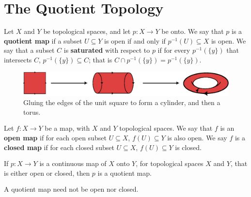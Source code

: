 
\section{The Quotient Topology}

\begin{definition}
    Let $X$ and  $Y$ be topological spaces, and let  $p:X \rightarrow Y$ be onto. We say that  $p$
    is a \textbf {quotient map} if a subset $U \subseteq Y$ is open if and only if  $p^{-1}(U)
    \subseteq X$ is open. We say that a subset $C$ is \textbf {saturated} with respect to $p$
    if for every $p^{-1}(\{y\})$ that intersects $C$,  $p^{-1}(\{y\}) \subseteq C$; that is $C \cap
    p^{-1}(\{y\})=p^{-1}(\{y\})$.
\end{definition}

\begin{figure}[h]
    \centering
    \includegraphics[scale = 0.5]{Figures/Chapter2/square_to_torus.eps}
    \caption{Gluing the edges of the unit square to form a cylinder, and then a torus.}
    \label{fig_2.2}
\end{figure}

\begin{definition}
    Let $f:X \rightarrow Y$ be a map, with $X$ and  $Y$ topological spaces. We say that  $f$ is an
    \textbf {open map} if for each open subset $U \subseteq X$,  $f(U) \subseteq Y$ is also open. We say $f$ is a
    \textbf {closed map} if for each closed subset $U \subseteq X$,  $f(U) \subseteq Y$ is closed.
\end{definition}

\begin{lemma}\label{4.4.1}
    If $p:X \rightarrow Y$ is a continuous map of  $X$ onto  $Y$, for topological spaces  $X$ and
    $Y$, that is either open or closed, then  $p$ is a quotient map.
\end{lemma}
\begin{remark}
    A quotient map need not be open nor closed.
\end{remark}

